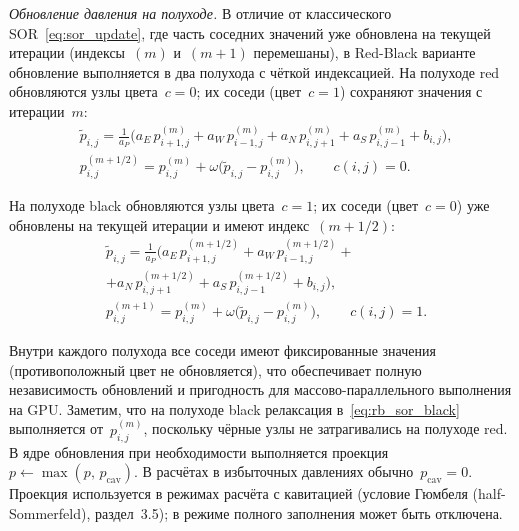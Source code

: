 \textit{Обновление давления на полуходе.}
В отличие от классического SOR~\eqref{eq:sor_update}, где часть соседних значений уже обновлена на текущей итерации (индексы~$(m)$ и~$(m+1)$ перемешаны), в Red-Black варианте обновление выполняется в два полухода с чёткой индексацией. На полуходе red обновляются узлы цвета~$c = 0$; их соседи (цвет~$c = 1$) сохраняют значения с итерации~$m$:
\begin{equation}\label{eq:rb_sor_red}
\begin{split}
  &\tilde{p}_{i,j} = \frac{1}{a_P}\bigl(
    a_E\,p_{i+1,j}^{(m)} + a_W\,p_{i-1,j}^{(m)}
    + a_N\,p_{i,j+1}^{(m)} + a_S\,p_{i,j-1}^{(m)}
    + b_{i,j}\bigr), \\
  &p_{i,j}^{(m+1/2)} = p_{i,j}^{(m)}
    + \omega\bigl(\tilde{p}_{i,j} - p_{i,j}^{(m)}\bigr),
    \qquad c(i,j) = 0.
\end{split}
\end{equation}

На полуходе black обновляются узлы цвета~$c = 1$; их соседи (цвет~$c = 0$) уже обновлены на текущей итерации и имеют индекс~$(m+1/2)$:
\begin{equation}\label{eq:rb_sor_black}
\begin{split}
  &\tilde{p}_{i,j} = \frac{1}{a_P}\bigl(
    a_E\,p_{i+1,j}^{(m+1/2)} + a_W\,p_{i-1,j}^{(m+1/2)} + \\
  &+ a_N\,p_{i,j+1}^{(m+1/2)} + a_S\,p_{i,j-1}^{(m+1/2)}
    + b_{i,j}\bigr), \\
  &p_{i,j}^{(m+1)} = p_{i,j}^{(m)}
    + \omega\bigl(\tilde{p}_{i,j} - p_{i,j}^{(m)}\bigr),
    \qquad c(i,j) = 1.
\end{split}
\end{equation}

Внутри каждого полухода все соседи имеют фиксированные значения (противоположный цвет не обновляется), что обеспечивает полную независимость обновлений и пригодность для массово-параллельного выполнения на GPU. Заметим, что на полуходе black релаксация в~\eqref{eq:rb_sor_black} выполняется от~$p_{i,j}^{(m)}$, поскольку чёрные узлы не затрагивались на полуходе red. В ядре обновления при необходимости выполняется проекция~$p \leftarrow \max(p,\, p_{\mathrm{cav}})$. В расчётах в избыточных давлениях обычно~$p_{\mathrm{cav}} = 0$. Проекция используется в режимах расчёта с кавитацией (условие Гюмбеля (half-Sommerfeld), раздел~3.5); в режиме полного заполнения может быть отключена.

